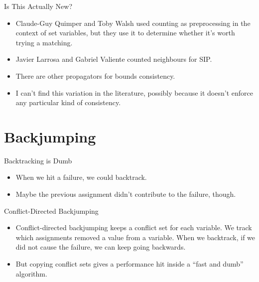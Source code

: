 \documentclass{beamer}
\begin{document}
\begin{frame}{Is This Actually New?}
    \begin{itemize}
        \item Claude-Guy Quimper and Toby Walsh used counting as preprocessing in the context of set
            variables, but they use it to determine whether it's worth trying a matching.

        \item Javier Larrosa and Gabriel Valiente counted neighbours for SIP.

        \item There are other propagators for bounds consistency.

        \item I can't find this variation in the literature, possibly because it doesn't enforce any
            particular kind of consistency.
    \end{itemize}
\end{frame}

\section{Backjumping}

\begin{frame}{Backtracking is Dumb}
    \begin{itemize}
        \item When we hit a failure, we could backtrack.
        \item Maybe the previous assignment didn't contribute to the failure, though.
    \end{itemize}
\end{frame}

\begin{frame}{Conflict-Directed Backjumping}
    \begin{itemize}
        \item Conflict-directed backjumping keeps a conflict set for each variable. We track
            which assignments removed a value from a variable. When we backtrack, if we did not
            cause the failure, we can keep going backwards.

        \item But copying conflict sets gives a performance hit inside a ``fast and dumb''
            algorithm.
    \end{itemize}
\end{frame}
\end{document}
